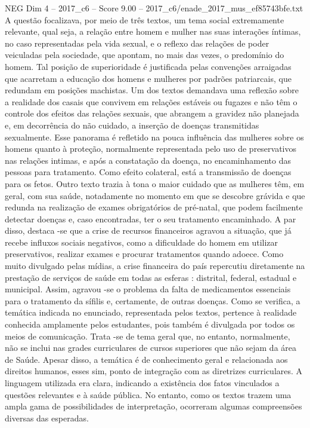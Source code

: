 \begin{textsample}{NEG Dim 4 – 2017\_c6 – Score 9.00 – 2017\_c6/enade\_2017\_mus\_ef85743bfe.txt}
A questão focalizava, por meio de três textos, um tema social extremamente relevante, qual seja, a relação entre homem e mulher nas suas interações íntimas, no caso representadas pela vida sexual, e o reflexo das relações de poder veiculadas pela sociedade, que apontam, no mais das vezes, o predomínio do homem.
Tal posição de superioridade é justificada pelas convenções arraigadas que acarretam a educação dos homens e mulheres por padrões patriarcais, que redundam em posições machistas.
Um dos textos demandava uma reflexão sobre a realidade dos casais que convivem em relações estáveis ou fugazes e não têm o controle dos efeitos das relações sexuais, que abrangem a gravidez não planejada e, em decorrência do não cuidado, a inserção de doenças transmitidas sexualmente.
Esse panorama é refletido na pouca influência das mulheres sobre os homens quanto à proteção, normalmente representada pelo uso de preservativos nas relações intimas, e após a constatação da doença, no encaminhamento das pessoas para tratamento.
Como efeito colateral, está a transmissão de doenças para os fetos.
Outro texto trazia à tona o maior cuidado que as mulheres têm, em geral, com sua saúde, notadamente no momento em que se descobre grávida e que redunda na realização de exames obrigatórios de pré-natal, que podem facilmente detectar doenças e, caso encontradas, ter o seu tratamento encaminhado.
A par disso, destaca -se que a crise de recursos financeiros agravou a situação, que já recebe influxos sociais negativos, como a dificuldade do homem em utilizar preservativos, realizar exames e procurar tratamentos quando adoece.
Como muito divulgado pelas mídias, a crise financeira do país repercutiu diretamente na prestação de serviços de saúde em todas as esferas : distrital, federal, estadual e municipal.
Assim, agravou -se o problema da falta de medicamentos essenciais para o tratamento da sífilis e, certamente, de outras doenças.
Como se verifica, a temática indicada no enunciado, representada pelos textos, pertence à realidade conhecida amplamente pelos estudantes, pois também é divulgada por todos os meios de comunicação.
Trata -se de tema geral que, no entanto, normalmente, não se inclui nas grades curriculares de cursos superiores que não sejam da área de Saúde.
Apesar disso, a temática é de conhecimento geral e relacionada aos direitos humanos, esses sim, ponto de integração com as diretrizes curriculares.
A linguagem utilizada era clara, indicando a existência dos fatos vinculados a questões relevantes e à saúde pública.
No entanto, como os textos trazem uma ampla gama de possibilidades de interpretação, ocorreram algumas compreensões diversas das esperadas.

\end{textsample}
